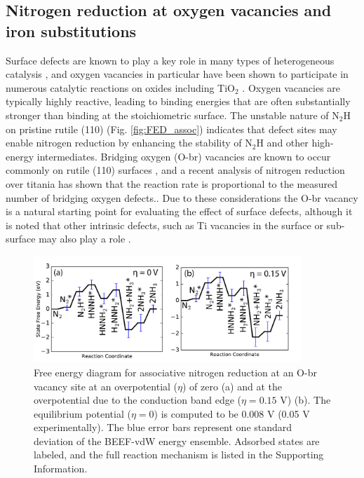 \documentclass[journal=ascecg,manuscript=article,articletitle=true]{achemso}
\begin{document}
\subsection{Nitrogen reduction at oxygen vacancies and iron substitutions}

Surface defects are known to play a key role in many types of heterogeneous catalysis \cite{Yates_1991}, and oxygen vacancies in particular have been shown to participate in numerous catalytic reactions on oxides \cite{McFarland_2013} including TiO$_2$ \cite{Kim2016,Kim2014,Diebold2003,Pang2008,Pang_2013}. Oxygen vacancies are typically highly reactive, leading to binding energies that are often substantially stronger than binding at the stoichiometric surface. The unstable nature of N$_2$H on pristine rutile (110) (Fig. \ref{fig:FED_assoc}) indicates that defect sites may enable nitrogen reduction by enhancing the stability of N$_2$H and other high-energy intermediates. Bridging oxygen (O-br) vacancies are known to occur commonly on rutile (110) surfaces \cite{Diebold2003,Pang2008,Pang_2013}, and a recent analysis of nitrogen reduction over titania has shown that the reaction rate is proportional to the measured number of bridging oxygen defects.\cite{Hirakawa_2017}. Due to these considerations the O-br vacancy is a natural starting point for evaluating the effect of surface defects, although it is noted that other intrinsic defects, such as Ti vacancies in the surface or sub-surface may also play a role \cite{Hobiger_1990}.

\begin{figure}
\includegraphics[width=0.9\textwidth]{figures/defect_associative_FED.pdf}
\caption{Free energy diagram for associative nitrogen reduction at an O-br vacancy site at an overpotential ($\eta$) of zero (a) and at the overpotential due to the conduction band edge ($\eta=0.15$ V) (b). The equilibrium potential ($\eta=0$) is computed to be 0.008 V (0.05 V experimentally). The blue error bars represent one standard deviation of the BEEF-vdW energy ensemble. Adsorbed states are labeled, and the full reaction mechanism is listed in the Supporting Information.}
\label{fig:FED_defect_assoc}
\end{figure}
\end{document}
